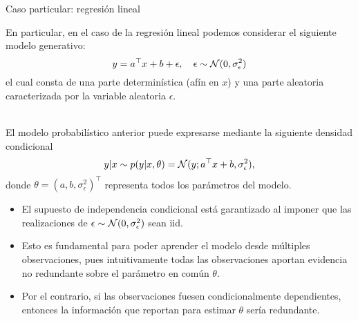 \documentclass[9pt]{beamer}
\begin{document}
\begin{frame}{Caso particular: regresión lineal}
	
En particular, en el caso de la regresión lineal podemos considerar el siguiente modelo  generativo:
\begin{equation*}
	y = a^\top x + b + \epsilon,\quad \epsilon\sim{\mathcal N}(0,\sigma_\epsilon^2)
\end{equation*}
el cual consta de una parte determinística (afín en $x$) y una parte aleatoria caracterizada por la variable aleatoria $\epsilon$.\\~\ \pause

El modelo probabilístico anterior puede expresarse mediante la siguiente densidad condicional 
\begin{equation*}
	y|x \sim p(y|x,\theta) = {\mathcal N}(y;a^\top x + b ,\sigma_\epsilon^2),\label{eq:mod_lin_gau}
\end{equation*}
donde $\theta=(a,b,\sigma_\epsilon^2)^\top$ representa todos los parámetros del modelo. \pause

\begin{itemize}
	\item El supuesto de independencia condicional está garantizado al imponer que las realizaciones de $\epsilon\sim{\mathcal N}(0,\sigma_\epsilon^2)$ sean iid.\pause
	\item  Esto es  fundamental para poder aprender el modelo desde múltiples observaciones, pues intuitivamente todas las observaciones aportan evidencia no redundante sobre el parámetro en común $\theta$.\pause
	\item  Por el contrario, si las observaciones fuesen condicionalmente dependientes, entonces la información que reportan para estimar $\theta$ sería redundante.
\end{itemize}
	
\end{frame}
\end{document}
